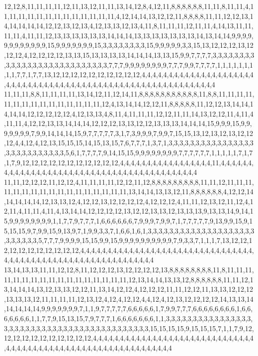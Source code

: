 12,12,8,11,11,11,11,12,11,13,12,11,11,13,14,12,8,4,12,11,8,8,8,8,8,8,11,11,8,11,11,4,11,11,11,11,11,11,11,11,11,11,11,11,11,4,12,14,14,13,12,12,11,8,8,8,8,11,11,12,12,13,14,14,14,14,14,12,12,13,12,13,4,12,13,13,12,13,4,11,8,11,11,11,12,11,11,4,14,13,11,11,11,11,4,11,11,12,13,13,13,13,13,13,14,14,14,13,13,13,13,13,13,13,14,13,14,14,9,9,9,9,9,9,9,9,9,9,9,9,15,9,9,9,9,9,9,9,15,3,3,3,3,3,3,3,3,15,9,9,9,9,9,3,3,15,13,12,12,12,13,12,12,12,4,12,12,12,12,13,13,15,13,13,13,13,14,14,14,13,13,15,9,9,7,7,7,7,3,3,3,3,3,3,3,3,3,3,3,3,3,3,3,3,3,3,3,3,3,3,3,3,3,3,3,7,7,7,9,9,9,9,9,9,9,9,7,7,7,9,9,7,7,7,7,1,1,1,1,1,1,1,1,1,7,7,1,7,7,13,12,12,12,12,12,12,12,12,12,12,4,4,4,4,4,4,4,4,4,4,4,4,4,4,4,4,4,4,4,4,4,4,4,4,4,4,4,4,4,4,4,4,4,4,4,4,4,4,4,4,4,4,4,4,4,4,4,4,4,4,4,4,4,4,4,4,4,4,4,4
11,11,11,8,8,11,11,11,11,13,14,12,11,12,14,11,8,8,8,8,8,8,8,8,8,8,8,11,8,8,11,11,11,11,11,11,11,11,11,11,11,11,11,11,11,12,4,13,14,14,12,12,11,8,8,8,8,8,11,12,12,13,14,14,14,14,14,12,12,12,12,12,4,12,13,13,4,8,11,4,11,11,11,12,12,11,11,14,13,12,12,11,4,11,4,11,11,4,12,12,13,13,14,14,14,12,12,12,13,13,12,12,13,13,13,14,14,14,15,9,9,9,15,9,9,9,9,9,9,9,7,9,9,14,14,14,15,9,7,7,7,7,7,3,1,7,3,9,9,9,7,9,9,7,15,15,13,12,13,12,13,12,12,12,4,4,12,4,12,13,15,15,15,14,15,13,15,7,6,7,7,7,1,3,7,1,3,3,3,3,3,3,3,3,3,3,3,3,3,3,3,3,3,3,3,3,3,3,3,3,3,3,3,5,6,1,7,7,7,7,9,14,15,15,9,9,9,9,9,9,9,9,7,7,7,7,7,7,1,1,1,1,1,7,1,7,1,7,9,12,12,12,12,12,12,12,12,12,12,12,4,4,4,4,4,4,4,4,4,4,4,4,4,4,4,4,4,11,4,4,4,4,4,4,4,4,4,4,4,4,4,4,4,4,4,4,4,4,4,4,4,4,4,4,4,4,4,4,4,4,4,4,4,4,4,4,4,4,4,4
11,11,12,12,12,11,12,12,4,11,11,11,11,12,12,11,12,8,8,8,8,8,8,8,8,8,11,11,12,11,11,11,11,11,11,11,11,11,11,11,11,11,11,11,11,11,13,14,14,13,13,12,11,8,8,8,8,8,8,4,12,12,14,14,14,14,14,12,13,13,12,4,12,12,13,12,12,12,12,4,12,12,12,4,11,11,12,13,12,11,12,4,12,11,4,11,11,4,11,4,13,14,14,12,12,12,12,13,12,12,13,13,12,13,13,13,9,13,13,14,9,14,15,9,9,9,9,9,9,9,9,1,1,7,7,9,7,7,7,1,6,6,6,6,6,6,7,9,9,9,7,9,9,7,1,7,7,7,7,7,9,13,9,9,15,9,15,15,15,9,7,9,9,15,9,13,9,7,1,9,9,3,3,7,1,6,6,1,6,1,3,3,3,3,3,3,3,3,3,3,3,3,3,3,3,3,3,3,3,3,3,3,3,3,3,3,5,7,7,7,9,9,9,9,15,15,9,9,15,9,9,9,9,9,9,9,9,9,9,7,9,3,3,7,1,1,1,7,13,12,12,12,12,12,12,12,12,12,12,12,4,4,4,4,4,4,4,4,4,4,4,4,4,4,4,4,4,4,4,4,4,4,4,4,4,4,4,4,4,4,4,4,4,4,4,4,4,4,4,4,4,4,4,4,4,4,4,4,4,4,4,4,4,4,4,4,4,4,4,4
13,14,13,13,11,11,12,12,8,11,12,12,12,13,12,12,12,12,13,8,8,8,8,8,8,8,8,11,8,11,11,11,11,11,11,11,11,11,11,11,11,11,11,11,11,11,12,13,14,14,13,13,12,8,8,8,8,8,8,11,11,12,13,14,14,14,13,12,13,13,12,12,11,13,14,12,12,4,12,12,12,11,11,12,12,11,13,13,12,12,12,13,13,13,12,11,11,11,11,12,13,12,4,12,4,12,12,4,4,12,4,12,13,12,12,12,12,14,13,13,14,14,14,14,14,9,9,9,9,9,9,9,7,1,1,9,7,7,7,7,7,6,6,6,6,6,1,7,9,9,7,7,7,6,6,6,6,6,6,6,6,1,6,6,6,6,6,6,6,1,1,7,7,9,15,13,15,7,9,7,7,7,1,6,6,6,6,6,6,6,1,1,3,3,3,3,3,3,3,3,3,3,3,3,3,3,3,3,3,3,3,3,3,3,3,3,3,3,3,3,3,3,3,3,3,3,3,3,3,3,3,3,3,3,3,15,15,15,15,9,15,15,15,7,1,1,7,9,12,12,12,12,12,12,12,12,12,12,12,4,4,4,4,4,4,4,4,4,4,4,4,4,4,4,4,4,4,4,4,4,4,4,4,4,4,4,4,4,4,4,4,4,4,4,4,4,4,4,4,4,4,4,4,4,4,4,4,4,4,4,4,4,4,4,4,4,4,4,4,4
